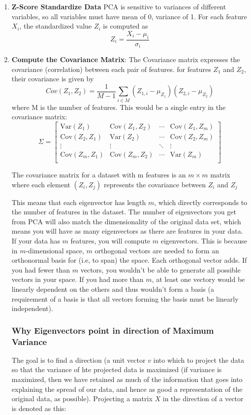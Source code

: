 \documentclass[12pt]{article}
\begin{document}
\begin{enumerate}
	\item \textbf{Z-Score Standardize Data} PCA is sensitive to variances of different variables, so all variables must have mean of 0, variance of 1. For each feature \(X_i\), the standardized value \(Z_i\) is computed as \[ Z_i = \frac{X_i - \mu_i}{\sigma_i}\]
    \item \textbf{Compute the Covariance Matrix}: The Covariance matrix expresses the covariance (correlation) between each pair of features. for features \(Z_1\) and \(Z_2\), their covariance is given by \[Cov(Z_1,Z_2) = \frac{1}{M-1} \sum_{i \in M} (Z_{1,i} - \mu_{Z_1})(Z_{2,i} - \mu_{Z_2})\]
where M is the number of features. This would be a single entry in the covariance matrix:
\[ \Sigma = 
\left[
\begin{array}{cccc}
\text{Var}(Z_1) & \text{Cov}(Z_1, Z_2) & \cdots & \text{Cov}(Z_1, Z_m) \\
\text{Cov}(Z_2, Z_1) & \text{Var}(Z_2) & \cdots & \text{Cov}(Z_2, Z_m) \\
\vdots & \vdots & \ddots & \vdots \\
\text{Cov}(Z_m, Z_1) & \text{Cov}(Z_m, Z_2) & \cdots & \text{Var}(Z_m) \\
\end{array}
\right]
\]

The covariance matrix for a dataset with m features is an \( m \times m \) matrix where each element \((Z_i,Z_j)\) represents the covariance between  \(Z_i\) and \(Z_j\)  

This means that each eigenvector has length \(m\), which directly corresponds to the number of features in the dataset. The number of eigenvectors you get from PCA will also match the dimensionality of the original data set, which means you will have as many eigenvectors as there are features in your data. If your data has \(m\) features, you will compute \(m\) eigenvectors. This is because in \(m\)-dimensional space, \(m\) orthogonal vectors are needed to form an orthonormal basis for (i.e, to span) the space. Each orthogonal vector adds. If you had fewer than \(m\) vectors, you wouldn't be able to generate all possible vectors in your space. If you had more than \(m\), at least one vectory would be linearly dependent on the others and thus wouldn't form a basis (a requirement of a basis is that all vectors forming the basis must be linearly independent). 

\subsubsection{Why Eigenvectors point in direction of Maximum Variance}
The goal is to find a direction (a unit vector \(v\) into which to project the data so that the variance of hte projected data is maximized (if variance is maximized, then we have retained as much of the information that goes into explaining the spread of our data, and hence as good a representation of the original data, as possible). Projecting a matrix \(X\) in the direction of a vector is denoted as this: 


\end{enumerate}
\end{document}

